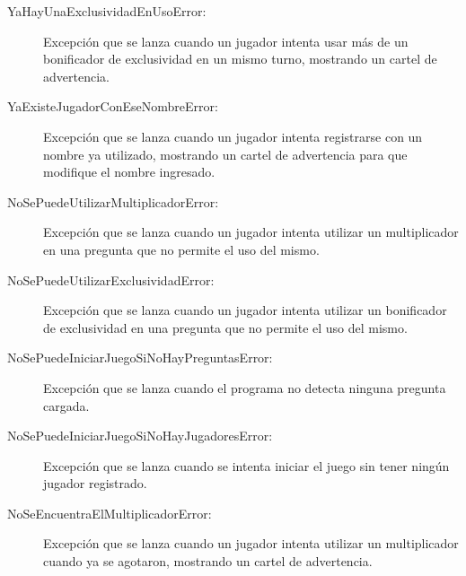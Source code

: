 \documentclass[titlepage,a4paper]{article}
\begin{document}
\begin{description}
\item[YaHayUnaExclusividadEnUsoError:] Excepción que se lanza cuando un jugador intenta usar más de un bonificador de exclusividad en un mismo turno, mostrando un cartel de advertencia.

\end{description}

\begin{description}
\item[YaExisteJugadorConEseNombreError:] Excepción que se lanza cuando un jugador intenta registrarse con un nombre ya utilizado, mostrando un cartel de advertencia para que modifique el nombre ingresado.

\end{description}

\begin{description}
\item[NoSePuedeUtilizarMultiplicadorError:] Excepción que se lanza cuando un jugador intenta utilizar un multiplicador en una pregunta que no permite el uso del mismo.

\end{description}

\begin{description}
\item[NoSePuedeUtilizarExclusividadError:] Excepción que se lanza cuando un jugador intenta utilizar un bonificador de exclusividad en una pregunta que no permite el uso del mismo.

\end{description}

\begin{description}
\item[NoSePuedeIniciarJuegoSiNoHayPreguntasError:] Excepción que se lanza cuando el programa no detecta ninguna pregunta cargada.

\end{description}

\begin{description}
\item[NoSePuedeIniciarJuegoSiNoHayJugadoresError:] Excepción que se lanza cuando se intenta iniciar el juego sin tener ningún jugador registrado.

\end{description}

\begin{description}
\item[NoSeEncuentraElMultiplicadorError:] Excepción que se lanza cuando un jugador intenta utilizar un multiplicador cuando ya se agotaron, mostrando un cartel de advertencia.

\end{description}
\end{document}
